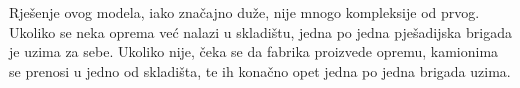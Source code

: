 \documentclass{article}
\begin{document}
\begin{figure}[H] 
  \noindent{}
\end{figure}

\noindent
Rješenje ovog modela, iako značajno duže, nije mnogo kompleksije od prvog. Ukoliko se neka oprema već nalazi u skladištu, jedna po jedna pješadijska brigada je uzima za sebe. Ukoliko nije, čeka se da fabrika proizvede opremu, kamionima se prenosi u jedno od skladišta, te ih konačno opet jedna po jedna brigada uzima.\\~\\
\end{document}
